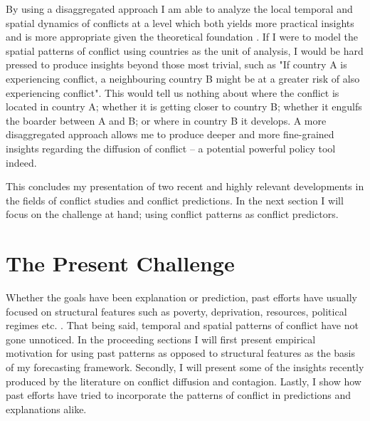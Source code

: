 \documentclass[a4paper]{article}
\begin{document}
By using a disaggregated approach I am able to analyze the local temporal and spatial dynamics of conflicts at a level which both yields more practical insights and is more appropriate given the theoretical foundation \citep[446]{ol2010afghanistan}. If I were to model the spatial patterns of conflict using countries as the unit of analysis, I would be hard pressed to produce insights beyond those most trivial, such as "If country A is experiencing conflict, a neighbouring country B might be at a greater risk of also experiencing conflict". This would tell us nothing about where the conflict is located in country A; whether it is getting closer to country B; whether it engulfs the boarder between A and B; or where in country B it develops. A more disaggregated approach allows me to produce deeper and more fine-grained insights regarding the diffusion of conflict -- a potential powerful policy tool indeed.\par 

This concludes my presentation of two recent and highly relevant developments in the fields of conflict studies and conflict predictions. In the next section I will focus on the challenge at hand; using conflict patterns as conflict predictors.\par 


\section{The Present Challenge}

Whether the goals have been explanation or prediction, past efforts have usually focused on structural features such as poverty, deprivation, resources, political regimes etc. \citep[10]{chadefaux2017conflict}. That being said, temporal and spatial patterns of conflict have not gone unnoticed. In the proceeding sections I will first present empirical motivation for using past patterns as opposed to structural features as the basis of my forecasting framework. Secondly, I will present some of the insights recently produced by the literature on conflict diffusion and contagion. Lastly, I show how past efforts have tried to incorporate the patterns of conflict in predictions and explanations alike. 
\end{document}

